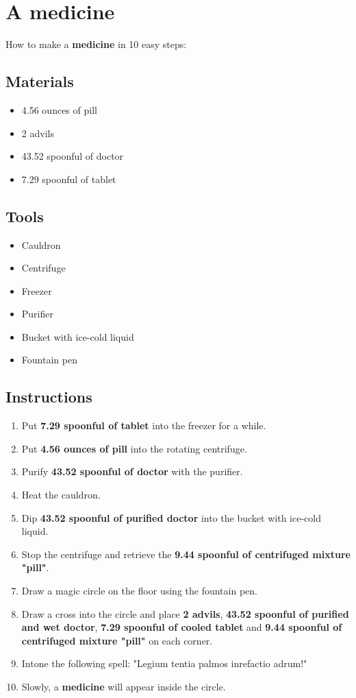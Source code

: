 \documentclass{article}
\begin{document}
\section{A medicine}How to make a \textbf{medicine} in 10 easy steps:

\subsection{Materials}\begin{itemize}
\item 
4.56 ounces of pill
\item 
2 advils
\item 
43.52 spoonful of doctor
\item 
7.29 spoonful of tablet
\end{itemize}
\subsection{Tools}\begin{itemize}
\item 
Cauldron
\item 
Centrifuge
\item 
Freezer
\item 
Purifier
\item 
Bucket with ice-cold liquid
\item 
Fountain pen
\end{itemize}
\subsection{Instructions}\begin{enumerate}
\item 
Put \textbf{7.29 spoonful of tablet} into the freezer for a while.
\item 
Put \textbf{4.56 ounces of pill} into the rotating centrifuge.
\item 
Purify \textbf{43.52 spoonful of doctor} with the purifier.
\item 
Heat the cauldron.
\item 
Dip \textbf{43.52 spoonful of purified doctor} into the bucket with ice-cold liquid.
\item 
Stop the centrifuge and retrieve the \textbf{9.44 spoonful of centrifuged mixture "pill"}.
\item 
Draw a magic circle on the floor using the fountain pen.
\item 
Draw a cross into the circle and place \textbf{2 advils}, \textbf{43.52 spoonful of purified and wet doctor}, \textbf{7.29 spoonful of cooled tablet} and \textbf{9.44 spoonful of centrifuged mixture "pill"} on each corner.
\item 
Intone the following spell: "Legium tentia palmos inrefactio adrum!"
\item 
Slowly, a \textbf{medicine} will appear inside the circle.
\end{enumerate}
\newpage
\end{document}
